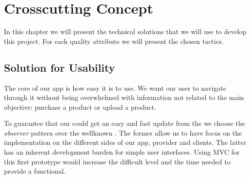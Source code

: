 \section{Crosscutting Concept} \label{Patterns_Tacticts}

In this chapter we will present the technical solutions that we will use to develop this project.
For each quality attribute we will present the chosen tactics.

\subsection{Solution for Usability}

The core of our app is how easy it is to use. We want our user to navigate through it without being overwhelmed with information
not related to the main objective: purchase a product or upload a product.


To guarantee that our  could get an easy and fast update from the  we choose 
the \textit{observer} pattern over the wellknown . The former allow us to have focus on the implementation
on the different sides of our app, provider and clients. The latter has an inherent development burden for simple user
interfaces. Using \gls{MVC} for this first prototype would increase the difficult level and the time needed to provide a 
functional. 

